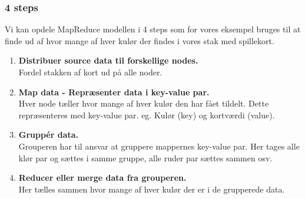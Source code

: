 \subsubsection{4 steps}
Vi kan opdele MapReduce modellen i 4 steps som for vores eksempel bruges til at finde ud af hvor mange af hver kulør der findes i vores stak med spillekort.

\begin{enumerate}
	\item \textbf{Distribuer source data til forskellige nodes.}\\
	Fordel stakken af kort ud på alle noder.
	\item \textbf{Map data - Repræsenter data i key-value par.}\\
	Hver node tæller hvor mange af hver kulør den har fået tildelt. Dette repræsenteres med key-value par. eg. Kulør (key) og kortværdi (value).
	\item \textbf{Gruppér data.} \\
	Grouperen har til ansvar at gruppere mappernes key-value par. Her tages alle klør par og sættes i samme gruppe, alle ruder par sættes sammen osv.
	\item \textbf{Reducer eller merge  data fra grouperen.}\\
	Her tælles sammen hvor mange af hver kulør der er i de grupperede data.
\end{enumerate}
